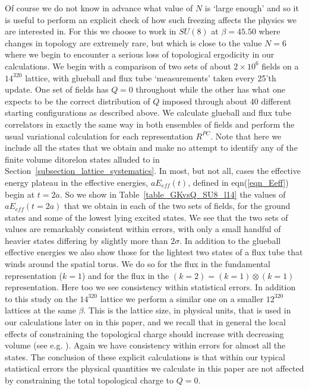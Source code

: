 \documentclass[12pt]{article}
\begin{document}
Of course we do not know in advance what value of $N$ is `large enough' and so it
is useful to perform
an explicit check of how such freezing affects the physics we are interested in.
For this we choose to work in $SU(8)$ at $\beta=45.50$ where changes in topology
are extremely rare, but which is close to the value $N=6$ where we begin to encounter
a serious loss of topological ergodicity in our calculations.
We begin with a comparison of two sets of about $2\times 10^6$ fields
on a $14^320$ lattice, with glueball and flux tube `measurements' taken every
25'th update. One set of fields has $Q=0$ throughout while the other has what one expects
to be the correct distribution of $Q$ imposed through about 40 different starting
configurations as described above. We calculate glueball and flux tube correlators
in exactly the same way in both ensembles of fields and perform the usual variational
calculation for each representation $R^{PC}$. Note that here we include all the states
that we obtain and make no attempt to identify any of the finite volume ditorelon states
alluded to in Section~\ref{subsection_lattice_systematics}.
In most, but not all, cases the effective
energy plateau in the effective energies, $aE_{eff}(t)$, defined in eqn(\ref{eqn_Eeff})
begin at $t=2a$. So we show in Table~\ref{table_GKvsQ_SU8_l14} the values of 
$aE_{eff}(t=2a)$ that we obtain in each of the two sets of fields, for the ground
states and some of the lowest lying excited states. We see that the two sets of values
are remarkably consistent within errors, with only a small handful of heavier states
differing by slightly more than $2\sigma$. In addition to the glueball effective
energies we also show those for the lightest two states of a flux tube that  winds
around the spatial torus. We do so for the flux in the fundamental representation
($k=1$) and for the flux in the $(k=2)=(k=1)\otimes (k=1)$ representation.
Here too we see consistency within statistical errors. In addition to this study
on the $14^320$ lattice we perform a similar one on a smaller $12^320$ lattices at
the same $\beta$. This is the lattice size, in physical units, that is used in
our calculations later on in this paper, and we recall that in general the local
effects of constraining the topological charge should increase with decreasing volume
(see e.g.
%
\cite{Aoki}).
%
Again we have consistency within errors for almost all the states.
The conclusion of these explicit calculations is that within our typical statistical
errors the physical quantities we calculate in this paper are not affected by
constraining the total topological charge to $Q=0$. 
\end{document}
